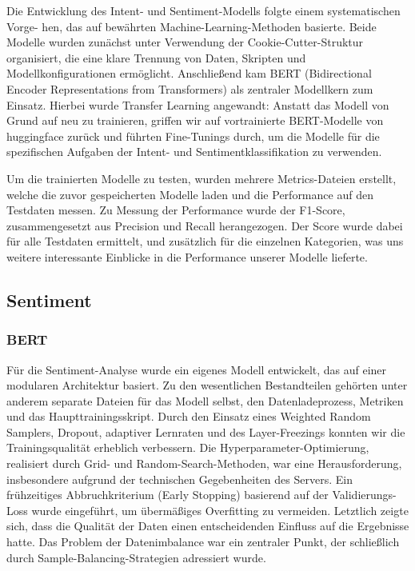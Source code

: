 Die Entwicklung des Intent- und Sentiment-Modells folgte einem systematischen Vorge- hen, 
das auf bewährten Machine-Learning-Methoden basierte. Beide Modelle wurden zunächst unter 
Verwendung der Cookie-Cutter-Struktur organisiert, die eine klare Trennung von Daten, Skripten 
und Modellkonfigurationen ermöglicht. Anschließend kam BERT (Bidirectional Encoder Representations 
from Transformers) als zentraler Modellkern zum Einsatz. Hierbei wurde Transfer Learning angewandt: 
Anstatt das Modell von Grund auf neu zu trainieren, griffen wir auf vortrainierte BERT-Modelle von 
huggingface zurück und führten Fine-Tunings durch, um die Modelle für die spezifischen Aufgaben der 
Intent- und Sentimentklassifikation zu verwenden.

Um die trainierten Modelle zu testen, wurden mehrere Metrics-Dateien erstellt, welche die zuvor 
gespeicherten Modelle laden und die Performance auf den Testdaten messen. Zu Messung der Performance 
wurde der F1-Score, zusammengesetzt aus Precision und Recall herangezogen. Der Score wurde dabei für 
alle Testdaten ermittelt, und zusätzlich für die einzelnen Kategorien, was uns weitere interessante 
Einblicke in die Performance unserer Modelle lieferte.
 

\subsection{Sentiment}
\subsubsection{BERT}

Für die Sentiment-Analyse wurde ein eigenes Modell entwickelt, das auf einer modularen
Architektur basiert. Zu den wesentlichen Bestandteilen gehörten unter anderem separate
Dateien für das Modell selbst, den Datenladeprozess, Metriken und das Haupttrainingsskript.
Durch den Einsatz eines Weighted Random Samplers, Dropout, adaptiver Lernraten und des
Layer-Freezings konnten wir die Trainingsqualität erheblich verbessern. Die
Hyperparameter-Optimierung, realisiert durch Grid- und Random-Search-Methoden, war eine
Herausforderung, insbesondere aufgrund der technischen Gegebenheiten des Servers. Ein
frühzeitiges Abbruchkriterium (Early Stopping) basierend auf der Validierungs-Loss wurde
eingeführt, um übermäßiges Overfitting zu vermeiden. Letztlich zeigte sich, dass die Qualität
der Daten einen entscheidenden Einfluss auf die Ergebnisse hatte. Das Problem der Datenimbalance
war ein zentraler Punkt, der schließlich durch Sample-Balancing-Strategien adressiert wurde. 


